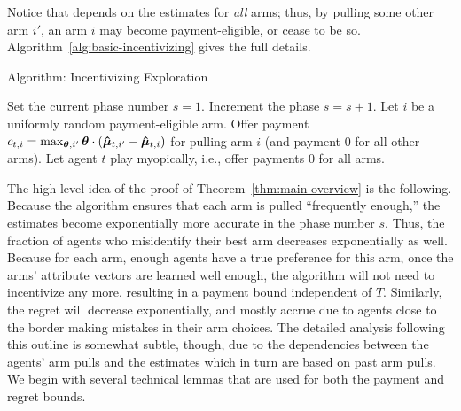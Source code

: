 Notice that  depends on the estimates for \emph{all}
arms; thus, by pulling some other arm $i'$, an arm $i$ may become
payment-eligible, or cease to be so.
Algorithm~\ref{alg:basic-incentivizing} gives the full details.


\begin{algorithm}
\caption{Algorithm: Incentivizing Exploration \label{alg:basic-incentivizing}}
\begin{algorithmic}
\STATE Set the current phase number $s = 1$.
\STATE Increment the phase $s = s + 1$.
\ENDIF
{}
\STATE Let $i$ be a uniformly random payment-eligible arm.
\STATE Offer payment
$c_{t,i} = \max_{\bm{\theta},i'} \bm{\theta} \cdot (\bm{\hat{\mu}}_{t,i'} - \bm{\hat{\mu}}_{t,i})$
for pulling arm $i$
(and payment 0 for all other arms).
\ELSE
\STATE Let agent $t$ play myopically, i.e., offer payments 0 for all arms.
\ENDIF
\ENDFOR
\end{algorithmic}
\end{algorithm}

The high-level idea of the proof of Theorem~\ref{thm:main-overview}
is the following.
Because the algorithm ensures that each arm is pulled
``frequently enough,''
the estimates  become exponentially more accurate in the
phase number $s$.
Thus, the fraction of agents who misidentify their best arm decreases
exponentially as well.
Because for each arm, enough agents have a true preference for this
arm, once the arms' attribute vectors are learned well enough,
the algorithm will not need to incentivize any more,
resulting in a payment bound independent of $T$.
Similarly, the regret will decrease exponentially, and mostly accrue
due to agents close to the border  making mistakes in their arm choices.
The detailed analysis following this outline is somewhat subtle, though,
due to the dependencies between the agents' arm pulls and the
estimates which in turn are based on past arm pulls.
We begin with several technical lemmas that are used for both the
payment and regret bounds.

